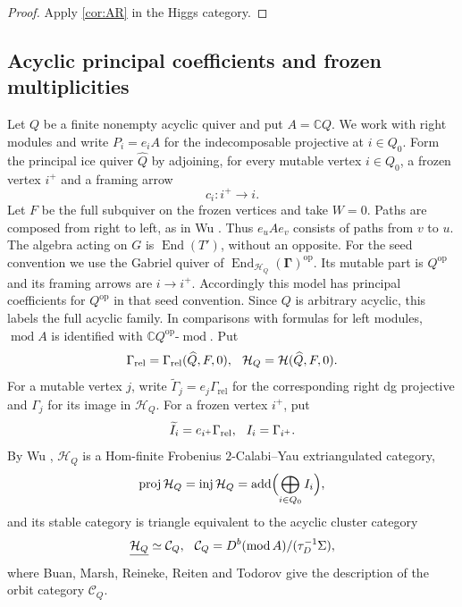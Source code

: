 \documentclass[11pt,reqno]{article}
\numberwithin{equation}{section}
\theoremstyle{definition}
\DeclareMathOperator{\add}{add}
\DeclareMathOperator{\End}{End}
\DeclareMathOperator{\proj}{proj}
\DeclareMathOperator{\inj}{inj}
\DeclareMathOperator{\modu}{mod}
\newcommand{\kk}{\mathbb C}
\begin{document}
\begin{proof}
Apply \cref{cor:AR} in the Higgs category.
\end{proof}

\subsection{Acyclic principal coefficients and frozen multiplicities}\label{subsec:principal}

Let $Q$ be a finite nonempty acyclic quiver and put $A=\kk Q$.  We work with right modules and write $P_i=e_iA$ for the indecomposable projective at $i\in Q_0$.  Form the principal ice quiver $\widehat Q$ by adjoining, for every mutable vertex $i\in Q_0$, a frozen vertex $i^+$ and a framing arrow
\[
 c_i\colon i^+\longrightarrow i.
\]
Let $F$ be the full subquiver on the frozen vertices and take $W=0$.  Paths are composed from right to left, as in Wu \cite[Definition~7.5]{WuRelative}. Thus $e_uAe_v$ consists of paths from $v$ to $u$. The algebra acting on $G$ is $\End(T')$, without an opposite. For the seed convention we use the Gabriel quiver of $\End_{\mathcal H_Q}(\boldsymbol\Gamma)^{\mathrm{op}}$. Its mutable part is $Q^{\mathrm{op}}$ and its framing arrows are $i\to i^+$. Accordingly this model has principal coefficients for $Q^{\mathrm{op}}$ in that seed convention. Since $Q$ is arbitrary acyclic, this labels the full acyclic family. In comparisons with formulas for left modules, $\modu A$ is identified with $\kk Q^{\mathrm{op}}\text{-}\modu$.  Put
\[
 \Gamma_{\mathrm{rel}}=\Gamma_{\mathrm{rel}}(\widehat Q,F,0),
 \hspace{2.5mm}
 \mathcal H_Q=\mathcal H(\widehat Q,F,0).
\]
For a mutable vertex $j$, write $\widetilde\Gamma_j=e_j\Gamma_{\mathrm{rel}}$ for the corresponding right dg projective and $\Gamma_j$ for its image in $\mathcal H_Q$.  For a frozen vertex $i^+$, put
\[
 \widetilde I_i=e_{i^+}\Gamma_{\mathrm{rel}},
  \hspace{2.5mm}
 I_i=\Gamma_{i^+}.
\]
By Wu \cite[Theorem~7.10]{WuRelative}, $\mathcal H_Q$ is a Hom-finite Frobenius $2$-Calabi--Yau extriangulated category,
\[
 \proj\mathcal H_Q=\inj\mathcal H_Q
 =\add\Bigl(\bigoplus_{i\in Q_0}I_i\Bigr),
\]
and its stable category is triangle equivalent to the acyclic cluster category
\[
 \underline{\mathcal H_Q}\simeq\mathcal C_Q,
 \hspace{2.5mm}
 \mathcal C_Q=D^b(\modu A)/(\tau_D^{-1}\Sigma),
\]
where Buan, Marsh, Reineke, Reiten and Todorov \cite{BMRRT} give the description of the orbit category $\mathcal C_Q$.
\end{document}
